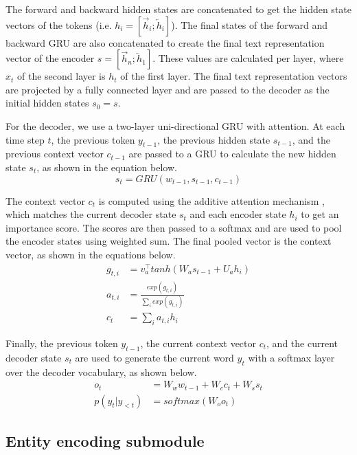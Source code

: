 \documentclass[11pt,a4paper]{article}
\begin{document}
The forward and backward hidden states are concatenated to get the hidden state vectors of the tokens (i.e. $h_i = [\overrightarrow{h}_i; \overleftarrow{h}_i]$). The final states of the forward and backward GRU are also concatenated to create the final text representation vector of the encoder $s = [\overrightarrow{h}_n; \overleftarrow{h}_1]$. These values are calculated per layer, where $x_t$ of the second layer is $h_t$ of the first layer. The final text representation vectors are projected by a fully connected layer and are passed to the decoder as the initial hidden states $s_0 = s$.

For the decoder, we use a two-layer uni-directional GRU with attention. At each time step $t$, the previous token $y_{t-1}$, the previous hidden state $s_{t-1}$, and the previous context vector $c_{t-1}$ are passed to a GRU to calculate the new hidden state $s_t$, as shown in the equation below.
\begin{equation}
    s_t = GRU(w_{t-1}, s_{t-1}, c_{t-1}) \nonumber
\end{equation}

The context vector $c_t$ is computed using the additive attention mechanism \cite{bahdanau2014neural}, which matches the current decoder state $s_t$ and each encoder state $h_i$ to get an importance score. The scores are then passed to a softmax and are used to pool the encoder states using weighted sum. The final pooled vector is the context vector, as shown in the equations below.
\begin{align*}
    g_{t,i} &= v_a^\top tanh(W_a s_{t-1} + U_a h_i) \\
    a_{t,i} &= \frac{exp(g_{t,i})}{\sum_i exp(g_{t,i})} \\
    c_t &= \sum_i a_{t,i} h_i \nonumber
\end{align*}

Finally, the previous token $y_{t-1}$, the current context vector $c_t$, and the current decoder state $s_t$ are used to generate the current word $y_t$ with a softmax layer over the decoder vocabulary, as shown below.
\begin{align*}
    o_t &= W_w w_{t-1} + W_c c_t + W_s s_t \\ 
    p(y_t | y_{<t}) &= softmax(W_o o_t) \nonumber
\end{align*}

\subsection{Entity encoding submodule}
\end{document}
